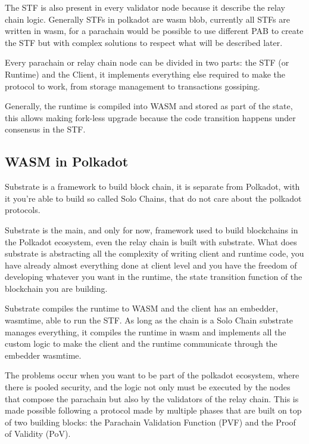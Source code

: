 \documentclass[../main.tex]{subfiles}
\begin{document}
The STF is also present in every validator node because it describe the relay chain logic. Generally STFs in polkadot are wasm blob, currently all STFs are written in wasm, for a parachain would be possible to use different PAB to create the STF but with complex solutions to respect what will be described later.

Every parachain or relay chain node can be divided in two parts: the STF (or Runtime) and the Client, it implements everything else required to make the protocol to work, from storage management to transactions gossiping.

Generally, the runtime is compiled into WASM and stored as part of the state, this allows making fork-less upgrade because the code transition happens under consensus in the STF.


\subsection{WASM in Polkadot}

Substrate is a framework to build block chain, it is separate from Polkadot, with it you're able to build so called Solo Chains, that do not care about the polkadot protocols.

Substrate is the main, and only for now, framework used to build blockchains in the Polkadot ecosystem, even the relay chain is built with substrate. What does substrate is abstracting all the complexity of writing client and runtime code, you have already almost everything done at client level and you have the freedom of developing whatever you want in the runtime, the state transition function of the blockchain you are building.

Substrate compiles the runtime to WASM and the client has an embedder, wasmtime, able to run the STF. As long as the chain is a Solo Chain substrate manages everything, it compiles the runtime in wasm and implements all the custom logic to make the client and the runtime communicate through the embedder wasmtime.

The problems occur when you want to be part of the polkadot ecosystem, where there is pooled security, and the logic not only must be executed by the nodes that compose the parachain but also by the validators of the relay chain. This is made possible following a protocol made by multiple phases that are built on top of two building blocks: the Parachain Validation Function (PVF) and the Proof of Validity (PoV).~\cite{parachain-protocol}
\end{document}
